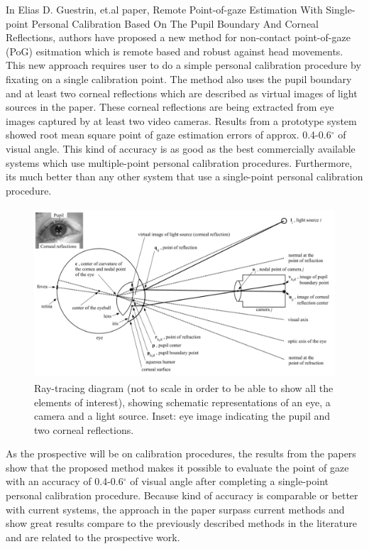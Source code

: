 In Elias D. Guestrin, et.al \cite{23} paper, Remote Point-of-gaze Estimation With Single-point Personal Calibration Based On The Pupil Boundary And Corneal Reflections, authors have proposed a new method for non-contact point-of-gaze (PoG) esitmation which is remote based and robust against head movements. This new approach requires user to do a simple personal calibration procedure by fixating on a single calibration point. The method also uses the pupil boundary and at least two corneal reflections which are described as virtual images of light sources in the paper. These corneal reflections are being extracted from eye images captured by at least two video cameras. Results from a prototype system showed root mean square point of gaze estimation errors of approx. 0.4-0.6$^{\circ}$ of visual angle. This kind of accuracy is as good as the best commercially available systems which use multiple-point personal calibration procedures. Furthermore, its much better than any other system that use a single-point personal calibration procedure.

\begin{figure}[!hbt]
  \centering
  \includegraphics[width=4.5in,height=2.5in]{elias.png}
  \caption{Ray-tracing diagram (not to scale in order to be able to show all the elements of interest), showing schematic representations of an eye, a camera and a light source. Inset: eye image indicating the pupil and two corneal reflections.}
  \label{elias}
\end{figure}


As the prospective will be on calibration procedures, the results from the papers show that the proposed method makes it possible to evaluate the point of gaze with an accuracy of 0.4-0.6$^{\circ}$ of visual angle after completing a single-point personal calibration procedure. Because kind of accuracy is comparable or better with current systems, the approach in the paper surpass current methods and show great results compare to the previously described methods in the literature and are related to the prospective work.

